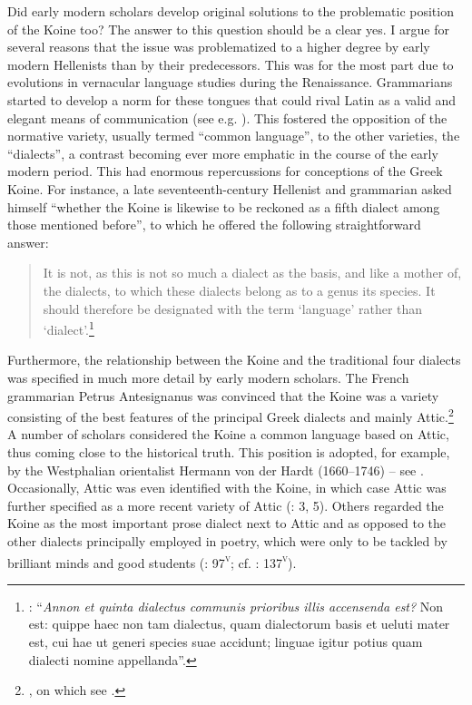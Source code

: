 {Did early modern scholars develop original solutions to the problematic position of the Koine too? The answer to this question should be a clear yes. I argue for several reasons that the issue was problematized to a higher degree by early modern Hellenists than by their predecessors. This was for the most part due to evolutions in vernacular language studies during the Renaissance. Grammarians started to develop a norm for these tongues that could rival Latin as a valid and elegant means of communication (see e.g. \citealt{Giard1992}). This fostered the opposition of the normative variety, usually termed “common language”, to the other varieties, the “dialects”, a contrast becoming ever more emphatic in the course of the early modern period. This had enormous repercussions for conceptions of the Greek Koine. For instance, a late seventeenth-century Hellenist and grammarian asked himself “whether the Koine is likewise to be reckoned as a fifth dialect among those mentioned before”, to which he offered the following straightforward answer:

\begin{quote}
It is not, as this is not so much a dialect as the basis, and like a mother of, the dialects, to which these dialects belong as to a genus its species. It should therefore be designated with the term ‘language’ rather than ‘dialect’.\footnote{\citet[495]{Ursin1691}: “\textit{Annon et quinta dialectus communis prioribus illis accensenda est?} Non est: quippe haec non tam dialectus, quam dialectorum basis et ueluti mater est, cui hae ut generi species suae accidunt; linguae igitur potius quam dialecti nomine appellanda”.}
\end{quote}

Furthermore, the relationship between the Koine and the traditional four dialects was specified in much more detail by early modern scholars. The French grammarian Petrus Antesignanus was convinced that the Koine was a variety consisting of the best features of the principal Greek dialects and mainly Attic.\footnote{\citet[12--13]{Antesignanus1554}, on which see \citet[130--131]{VanRooy2016c}.} A number of scholars considered the Koine a common language based on Attic, thus coming close to the historical truth. This position is adopted, for example, by the Westphalian orientalist Hermann von der Hardt (1660–1746) – see \citet[17--18]{Von1705}. Occasionally, Attic was even identified with the Koine, in which case Attic was further specified as a more recent variety of Attic (\citealt{Georgi1733}: 3, 5). Others regarded the Koine as the most important prose dialect next to Attic and as opposed to the other dialects principally employed in poetry, which were only to be tackled by brilliant minds and good students (\citealt{Vives1531}: 97\textsc{\textsuperscript{v}}; cf. \citealt{Vuidius1569}: 137\textsc{\textsuperscript{v}}).

}
